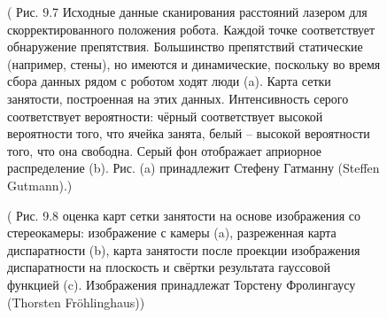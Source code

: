 \documentclass[10pt,a4paper]{article}
\begin{document}
\begin{figure}[H]
	\caption{ ( Рис. 9.7 Исходные данные сканирования расстояний лазером  для скорректированного положения робота. Каждой точке соответствует обнаружение препятствия. Большинство препятствий статические (например, стены), но имеются и  динамические, поскольку во время сбора данных рядом с роботом ходят люди (a). Карта сетки занятости, построенная на этих данных. Интенсивность серого соответствует вероятности: чёрный соответствует высокой вероятности того, что ячейка занята, белый – высокой вероятности того, что она свободна. Серый фон отображает априорное распределение (b). Рис. (a) принадлежит Стефену Гатманну (Steffen Gutmann).)}
	\label{fig:97orig}
\end{figure}

\begin{figure}[H]
	\caption{ ( Рис. 9.8 оценка карт сетки занятости на основе изображения со стереокамеры: изображение с камеры (a),  разреженная карта диспаратности (b), карта занятости после проекции изображения диспаратности на плоскость и свёртки результата гауссовой функцией (c). Изображения принадлежат Торстену Фролингаусу (Thorsten Fröhlinghaus))}
	\label{fig:98orig}
\end{figure}
\end{document}
